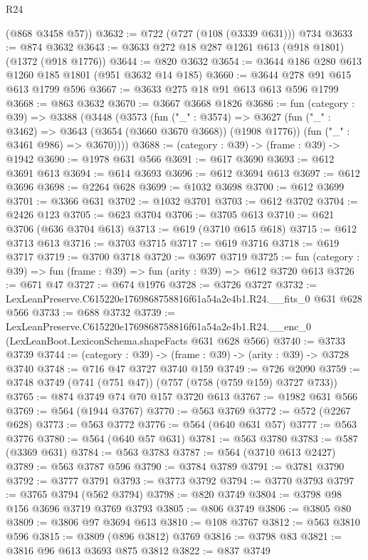 \begin{lexlean}{R24}
\begin{coremodule}
      (@868 @3458 @57))
@3632 := @722 (@727 (@108 (@3339 @631))) @734
@3633 := @874 @3632
@3643 := @3633 @272 @18 @287 @1261 @613 (@918 @1801) (@1372 (@918 @1776))
@3644 := @820 @3632
@3654 := @3644 @186 @280 @613 @1260 @185 @1801 (@951 @3632 @14 @185)
@3660 := @3644 @278 @91 @615 @613 @1799 @596
@3667 := @3633 @275 @18 @91 @613 @613 @596 @1799
@3668 := @863 @3632
@3670 := @3667 @3668 @1826
@3686 := fun (category : @39) =>
  @3388
    (@3448
      (@3573
        (fun ("_" : @3574) =>
        @3627
          (fun ("_" : @3462) => @3643 (@3654 (@3660 @3670 @3668)) (@1908 @1776))
          (fun ("_" : @3461 @986) => @3670))))
@3688 := (category : @39) -> (frame : @39) -> @1942
@3690 := @1978 @631 @566
@3691 := @617 @3690
@3693 := @612 @3691 @613
@3694 := @614 @3693
@3696 := @612 @3694 @613
@3697 := @612 @3696
@3698 := @2264 @628
@3699 := @1032 @3698
@3700 := @612 @3699
@3701 := @3366 @631
@3702 := @1032 @3701
@3703 := @612 @3702
@3704 := @2426 @123
@3705 := @623 @3704
@3706 := @3705 @613
@3710 := @621 @3706 (@636 @3704 @613)
@3713 := @619 (@3710 @615 @618)
@3715 := @612 @3713 @613
@3716 := @3703 @3715
@3717 := @619 @3716
@3718 := @619 @3717
@3719 := @3700 @3718
@3720 := @3697 @3719
@3725 := fun (category : @39) => fun (frame : @39) => fun (arity : @39) => @612 @3720 @613
@3726 := @671 @47
@3727 := @674 @1976
@3728 := @3726 @3727
@3732 := LexLeanPreserve.C615220e1769868758816f61a54a2e4b1.R24.__fits_0 @631 @628 @566
@3733 := @688 @3732
@3739 := LexLeanPreserve.C615220e1769868758816f61a54a2e4b1.R24.__enc_0
    (LexLeanBoot.LexiconSchema.shapeFacts @631 @628 @566)
@3740 := @3733 @3739
@3744 := (category : @39) -> (frame : @39) -> (arity : @39) -> @3728 @3740
@3748 := @716 @47 @3727 @3740 @159
@3749 := @726 @2090
@3759 := @3748 @3749 (@741 (@751 @47)) (@757 (@758 (@759 @159) @3727 @733))
@3765 := @874 @3749 @74 @70 @157 @3720 @613
@3767 := @1982 @631 @566
@3769 := @564 (@1944 @3767)
@3770 := @563 @3769
@3772 := @572 (@2267 @628)
@3773 := @563 @3772
@3776 := @564 (@640 @631 @57)
@3777 := @563 @3776
@3780 := @564 (@640 @57 @631)
@3781 := @563 @3780
@3783 := @587 (@3369 @631)
@3784 := @563 @3783
@3787 := @564 (@3710 @613 @2427)
@3789 := @563 @3787 @596
@3790 := @3784 @3789
@3791 := @3781 @3790
@3792 := @3777 @3791
@3793 := @3773 @3792
@3794 := @3770 @3793
@3797 := @3765 @3794 (@562 @3794)
@3798 := @820 @3749
@3804 := @3798 @98 @156 @3696 @3719 @3769 @3793
@3805 := @806 @3749
@3806 := @3805 @80
@3809 := @3806 @97 @3694 @613
@3810 := @108 @3767
@3812 := @563 @3810 @596
@3815 := @3809 (@896 @3812) @3769
@3816 := @3798 @83
@3821 := @3816 @96 @613 @3693 @875 @3812
@3822 := @837 @3749

\end{coremodule}
\end{lexlean}
